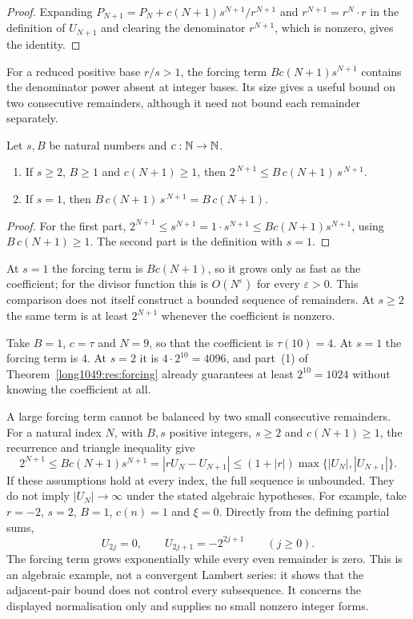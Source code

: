 \documentclass[11pt]{article}
\begin{document}
\begin{proof}
Expanding
$P_{N+1}=P_N+c(N+1)s^{N+1}/r^{N+1}$ and $r^{N+1}=r^{N}\cdot r$ in the
definition of $U_{N+1}$ and clearing the denominator $r^{N+1}$, which is
nonzero, gives the identity.
\end{proof}

For a reduced positive base $r/s>1$, the forcing term
$Bc(N+1)s^{N+1}$ contains the denominator power absent at integer
bases. Its size gives a useful bound on two consecutive remainders,
although it need not bound each remainder separately.

\begin{theorem}\label{long1049:res:forcing}
Let $s,B$ be natural numbers and $c:\mathbb{N}\to\mathbb{N}$.
\begin{enumerate}
\item If $s\ge2$, $B\ge1$ and $c(N+1)\ge1$, then
$2^{\,N+1}\le B\,c(N+1)\,s^{\,N+1}$.
\item If $s=1$, then $B\,c(N+1)\,s^{\,N+1}=B\,c(N+1)$.
\end{enumerate}
\end{theorem}

\begin{proof}
For the first part,
$2^{N+1}\le s^{N+1}=1\cdot s^{N+1}\le Bc(N+1)s^{N+1}$,
using $B\,c(N+1)\ge1$.  The second part is the definition with $s=1$.
\end{proof}

At $s=1$ the forcing term is $Bc(N+1)$, so it grows only as fast as the
coefficient; for the divisor function this is $O(N^{\varepsilon})$ for every
$\varepsilon>0$. This comparison does not itself construct a bounded
sequence of remainders.  At $s\ge2$ the same
term is at least $2^{N+1}$ whenever the coefficient is nonzero.

\begin{example}\label{long1049:ex:forcing}
Take $B=1$, $c=\tau$ and $N=9$, so that the coefficient is $\tau(10)=4$.  At
$s=1$ the forcing term is $4$.  At $s=2$ it is $4\cdot2^{10}=4096$, and part~(1)
of Theorem~\ref{long1049:res:forcing} already guarantees at least $2^{10}=1024$ without
knowing the coefficient at all.
\end{example}

A large forcing term cannot be balanced by two small consecutive
remainders. For a natural index $N$, with $B,s$ positive integers,
$s\ge2$ and $c(N+1)\ge1$, the recurrence and triangle inequality give
\[
 2^{N+1}\le Bc(N+1)s^{N+1}
 =|rU_N-U_{N+1}|
 \le(1+|r|)\max\{|U_N|,|U_{N+1}|\}.
\]
If these assumptions hold at every index, the full sequence is unbounded.
They do not imply $|U_N|\to\infty$ under the stated algebraic hypotheses. For example, take $r=-2$, $s=2$,
$B=1$, $c(n)=1$ and $\xi=0$. Directly from the defining partial sums,
\[
 U_{2j}=0,\qquad U_{2j+1}=-2^{2j+1}\qquad(j\ge0).
\]
The forcing term grows exponentially while every even remainder is
zero. This is an algebraic example, not a convergent Lambert series: it
shows that the adjacent-pair bound does not control every subsequence.
It concerns the displayed normalisation only and supplies no small
nonzero integer forms.
\end{document}
